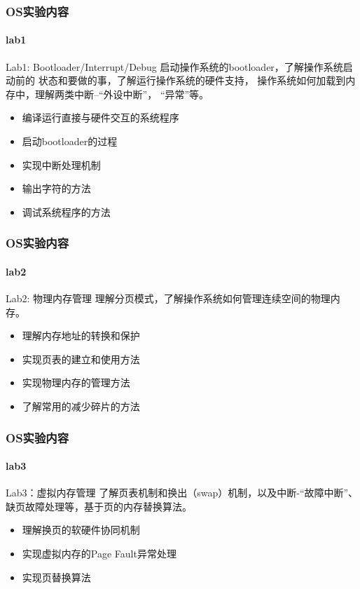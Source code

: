 \documentclass[UTF8]{ctexbeamer}
\begin{document}
\begin{frame}
\frametitle{OS实验内容}
\framesubtitle{lab1}
\begin{block}{Lab1:  Bootloader/Interrupt/Debug}
启动操作系统的bootloader，了解操作系统启动前的
状态和要做的事，了解运行操作系统的硬件支持，
操作系统如何加载到内存中，理解两类中断--“外设中断”，   
“异常”等。
\end{block}

\begin{itemize}
    \item 编译运行直接与硬件交互的系统程序
    \item 启动bootloader的过程
    \item 实现中断处理机制
    \item 输出字符的方法
    \item 调试系统程序的方法
\end{itemize}
    
\end{frame}


\begin{frame}
\frametitle{OS实验内容}
\framesubtitle{lab2}

\begin{block}{Lab2:  物理内存管理}
理解分页模式，了解操作系统如何管理连续空间的物理内存。
\end{block}

\begin{itemize}
    \item 理解内存地址的转换和保护
    \item 实现页表的建立和使用方法
    \item 实现物理内存的管理方法
    \item 了解常用的减少碎片的方法
\end{itemize}

\end{frame}

\begin{frame}
\frametitle{OS实验内容}
\framesubtitle{lab3}

\begin{block}{Lab3：虚拟内存管理}
了解页表机制和换出（swap）机制，以及中断-“故障中断”、
缺页故障处理等，基于页的内存替换算法。
\end{block}

\begin{itemize}
    \item 理解换页的软硬件协同机制
    \item 实现虚拟内存的Page Fault异常处理
    \item 实现页替换算法
\end{itemize}

\end{frame}
\end{document}
